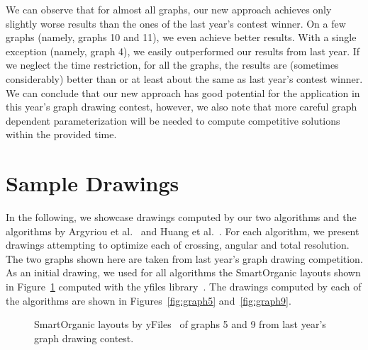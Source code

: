 \documentclass[runningheads]{llncs}
\begin{document}
{We can observe that for almost all graphs, our new approach achieves only slightly worse results than the ones of the last year's contest winner. On a few graphs (namely, graphs 10 and 11), we even achieve better results. With a single exception (namely, graph 4), we easily outperformed our results from last year.
If we neglect the time restriction, for all the graphs, the results  are (sometimes considerably) better than or at least about the same as last year's contest winner. We can conclude that our new approach has good potential for the application in this year's graph drawing contest, however, we also note that more careful graph dependent parameterization will be needed to compute competitive solutions within the provided time.

\newpage

\section{Sample Drawings}
\label{app:samples}

In the following, we showcase drawings computed by our two algorithms and the algorithms by Argyriou et al.~\cite{DBLP:journals/cj/ArgyriouBS13} and Huang et al.~\cite{DBLP:journals/vlc/HuangEHL13}. For each algorithm, we present drawings attempting to optimize each of crossing, angular and total resolution. The two graphs shown here are taken from last year's graph drawing competition. As an initial drawing, we used for all algorithms the SmartOrganic layouts shown in Figure~\ref{fig:graph5And9-yfiles} computed with the yfiles library~\cite{DBLP:books/sp/04/WieseE004}. The drawings computed by each of the algorithms are shown in Figures~\ref{fig:graph5} and~\ref{fig:graph9}.

\begin{figure}[htbp]
\centering
{}
\hfil
{}
\caption{SmartOrganic layouts by yFiles~\cite{DBLP:books/sp/04/WieseE004} of graphs 5 and 9 from last year's graph drawing contest.}
\label{fig:graph5And9-yfiles}
\end{figure}

}
\end{document}
